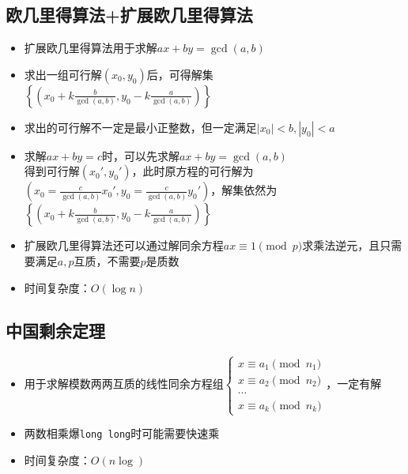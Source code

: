 \documentclass[twocolumn,a4,8pt]{article}  %
\begin{document}
	 	\subsection{欧几里得算法+扩展欧几里得算法}	 	
	 		\noindent\begin{itemize}
	 			\item 扩展欧几里得算法用于求解$ax+by=\gcd(a,b)$
	 			\item 求出一组可行解$(x_0,y_0)$后，可得解集\\ $\left\{\left(x_0+k\frac{b}{\gcd(a,b)},y_0-k\frac{a}{\gcd(a,b)}\right)\right\}$
	 			\item 求出的可行解不一定是最小正整数，但一定满足$|x_0|<b,|y_0|<a$
	 			\item 求解$ax+by=c$时，可以先求解$ax+by=\gcd(a,b)$\\ 得到可行解$(x_0',y_0')$，此时原方程的可行解为\\ $\left(x_0=\frac{c}{\gcd(a,b)}x_0',y_0=\frac{c}{\gcd(a,b)}y_0'\right)$，解集依然为\\ $\left\{\left(x_0+k\frac{b}{\gcd(a,b)},y_0-k\frac{a}{\gcd(a,b)}\right)\right\}$
	 			\item 扩展欧几里得算法还可以通过解同余方程$ax\equiv 1\pmod p$求乘法逆元，且只需要满足$a,p$互质，不需要$p$是质数
		 		\item 时间复杂度：$O(\log n)$
	 		\end{itemize}
	 	 	
	
	 	\subsection{中国剩余定理}
	 		\noindent\begin{itemize}
	 			\item 用于求解模数两两互质的线性同余方程组$\begin{cases}x\equiv a_1\pmod{n_1}\\x\equiv a_2\pmod{n_2}\\\cdots\\x\equiv a_k\pmod{n_k}\end{cases}$，一定有解
	 			\item 两数相乘爆\texttt{long long}时可能需要快速乘
		 		\item 时间复杂度：$O(n\log)$
	 		\end{itemize}
	 	 	
	
\end{document}
